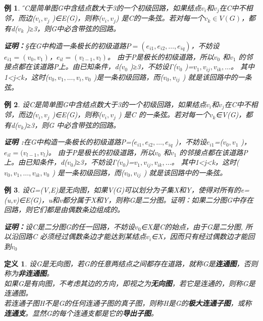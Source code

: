 \documentclass[11pt,a4paper,openany]{book}
\newtheorem{defination}{\textbf{定义}}[section]
\newtheorem{sample}{\textbf{例}}[section]
\begin{document}
\begin{sample}
\H 设C是简单图G中含结点数大于3的一个初级回路，如果结点$v_i$和$v_j$在C中不相邻，而边($v_i,v_j$ )∈E(G)，则称($v_i,v_j $) 是C的一条弦。若对每一个$v_k∈V(G)$，都有d($v_k$ )≥3，则G中必含带弦的回路。
\begin{adjustwidth}{0.62cm}{0.62cm}
\textbf{证明：}\S {在G中构造一条极长的初级道路$P=(e_{i1},e_{i2},\dots,e_{iq} )$，不妨设$e_{i1}=(v_0,v_1 )$，$e_{il}=(v_{l-1},v_l )$。 由于P是极长的初级道路，所以$v_0$ 和$v_1$ 的邻接点都在该道路P上。由已知条件，d($v_0$ )≥3，不妨设Γ($v_0$ )={$v_1,v_{ij},v_{ik},\dots$}。 其中1<j<k，这时($v_0,v_1,\dots,v_{i},v_0$ )是一条初级回路，而($v_0,v_{ij}$ ) 就是该回路中的一条弦。}
 \end{adjustwidth}
\end{sample}
\begin{sample}
设C是简单图G中含结点数大于3的一个初级回路，如果结点$v_i$和$v_j$在C中不相邻，而边($v_i,v_j$ )∈E(G)，则称($v_i,v_j$ ) 是C 的一条弦。若对每一个$v_k$∈V(G)，都有d($v_k$)≥3，则G 中必含带弦的回路。
\begin{adjustwidth}{0.62cm}{0.62cm}
\textbf{证明 :}在G中构造一条极长的初级道路P=($e_{i1},e_{i2},\dots,e_{iq}$ )，不妨设$e_{i1}$=($v_0,v_1$ )，$e_{il}=(v_{l-1},v_l $)。 由于P是极长的初级道路，所以$v_0$ 和$v_1$ 的邻接点都在该道路P上。由已知条件，d($v_0$)≥3，不妨设Γ($v_0$)={$v_1,v_{ij},v_{ik},\dots$}。 其中1<j<k，这时($v_0,v_1,\dots,v_{ik},v_0$ ) 是一条初级回路，而($v_0,v_{ij}$ ) 就是该回路中的一条弦。
\end{adjustwidth}
\end{sample}
\begin{sample}
设G=(V,E)是无向图，如果V(G)可以划分为子集X和Y，使得对所有的e=(u,v)∈E(G)，u和v都分属于X和Y，则称G是二分图。证明：如果二分图G中存在回路，则它们都是由偶数条边组成的。
\begin{adjustwidth}{0.62cm}{0.62cm}
\textbf{证明：}设C是二分图G的任一回路，不妨设$v_0$∈X是C的始点，由于G是二分图, 所以沿回路C 必须经过偶数条边才能达到某结点$v_i$∈X，因而只有经过偶数边才能回到$v_0$
\end{adjustwidth}
\end{sample}
\begin{defination}\K
 设G是无向图，若G的任意两结点之间都存在道路，就称G是\textbf{连通图}，否则称为\textbf{非连通图}。\\
 如果G是有向图，不考虑其边的方向，即视之为\textbf{无向图}，若它是连通的，则称G是连通图。\\
若连通子图H不是G的任何连通子图的真子图，则称H是G的\textbf{极大连通子图}，或称\textbf{连通支}。显然G的每个连通支都是它的\textbf{导出子图}。
\end{defination}
\end{document}
